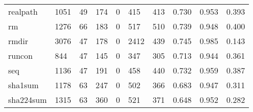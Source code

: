 \begin{longtable}{lp{2.0cm}p{2.0cm}p{2.0cm}p{2.0cm}p{2.0cm}p{2.0cm}p{2.0cm}p{2.0cm}p{2.0cm}}
realpath  &                   1051 &                                 49 &                               174 &                                0 &                               415 &                             413 &                                   0.730 &                                  0.953 &                                0.393 \\
rm        &                   1276 &                                 66 &                               183 &                                0 &                               517 &                             510 &                                   0.739 &                                  0.948 &                                0.400 \\
rmdir     &                   3076 &                                 47 &                               178 &                                0 &                              2412 &                             439 &                                   0.745 &                                  0.985 &                                0.143 \\
runcon    &                    844 &                                 47 &                               145 &                                0 &                               347 &                             305 &                                   0.713 &                                  0.944 &                                0.361 \\
seq       &                   1136 &                                 47 &                               191 &                                0 &                               458 &                             440 &                                   0.732 &                                  0.959 &                                0.387 \\
sha1sum   &                   1178 &                                 63 &                               247 &                                0 &                               502 &                             366 &                                   0.683 &                                  0.947 &                                0.311 \\
sha224sum &                   1315 &                                 63 &                               360 &                                0 &                               521 &                             371 &                                   0.648 &                                  0.952 &                                0.282 \\

\end{longtable}
